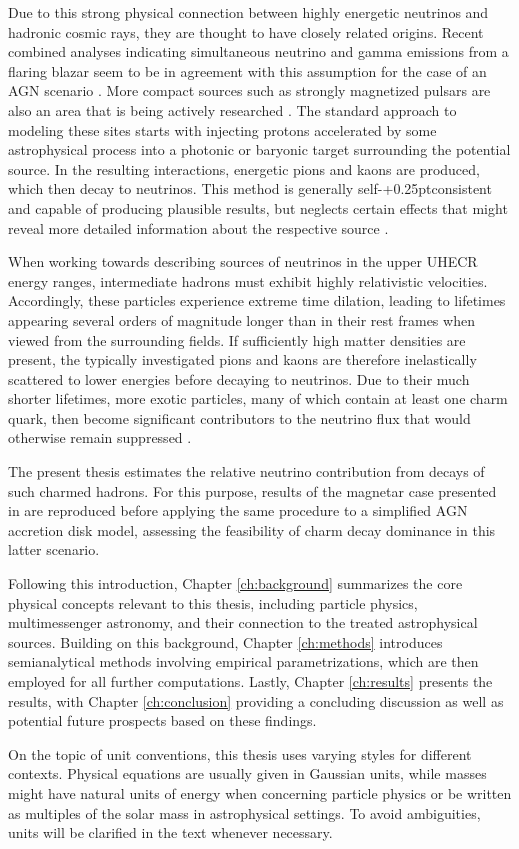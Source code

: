 Due to this strong physical connection between highly energetic neutrinos and hadronic cosmic rays, they are thought to have
closely related origins. Recent combined analyses indicating simultaneous neutrino and gamma emissions from a
flaring blazar seem to be in agreement with this assumption for the case of an AGN scenario \cite{ic_blazar_flare, ic_blazar_signal}.
More compact sources such as strongly magnetized pulsars are also an area that is being actively researched \cite{Murase_2009}.
The standard approach to modeling these sites starts with injecting protons accelerated by some astrophysical process into
a photonic or baryonic target surrounding the potential source. In the resulting interactions, energetic pions and kaons are
produced, which then decay to neutrinos. This method is generally self-{\kern+0.25pt}consistent and capable of producing
plausible results, but neglects certain effects that might reveal more detailed information about the respective source
\cite{Carpio_2020}.

When working towards describing sources of neutrinos in the upper UHECR energy ranges, intermediate hadrons must exhibit
highly relativistic velocities. Accordingly, these particles experience extreme time dilation, leading to lifetimes
appearing several orders of magnitude longer than in their rest frames when viewed from the surrounding fields.
If sufficiently high matter densities are present, the typically investigated pions and kaons are therefore inelastically
scattered to lower energies before decaying to neutrinos. Due to their much shorter lifetimes, more exotic particles, many
of which contain at least one charm quark, then become significant contributors to the neutrino flux that would otherwise
remain suppressed \cite{Tjus_2023}.

The present thesis estimates the relative neutrino contribution from decays of such charmed hadrons. For this purpose, results
of the magnetar case presented in \cite{Carpio_2020} are reproduced before applying the same procedure to a simplified AGN
accretion disk model, assessing the feasibility of charm decay dominance in this latter scenario.

Following this introduction, Chapter \ref{ch:background} summarizes the core physical concepts relevant to this thesis,
including particle physics, multimessenger astronomy, and their connection to the treated astrophysical sources. Building
on this background, Chapter \ref{ch:methods} introduces semianalytical methods involving empirical parametrizations,
which are then employed for all further computations. Lastly, Chapter \ref{ch:results} presents the results, with Chapter
\ref{ch:conclusion} providing a concluding discussion as well as potential future prospects based on these findings.

On the topic of unit conventions, this thesis uses varying styles for different contexts. Physical equations are usually given
in Gaussian units, while masses might have natural units of energy when concerning particle physics or be written as multiples
of the solar mass in astrophysical settings. To avoid ambiguities, units will be clarified in the text whenever necessary.
